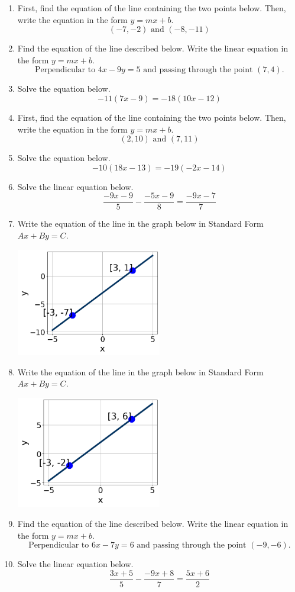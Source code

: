 \documentclass[14pt]{extbook}
\begin{document}
\begin{enumerate}
\item{
First, find the equation of the line containing the two points below. Then, write the equation in the form $ y=mx+b $.\[ (-7, -2) \text{ and } (-8, -11) \]} \newpage
\item{
Find the equation of the line described below. Write the linear equation in the form $y=mx+b$.\[ \text{Perpendicular to } 4 x - 9 y = 5 \text{ and passing through the point } (7, 4). \]} \newpage
\item{
Solve the equation below.\[ -11(7x -9) = -18(10x -12) \]} \newpage
\item{
First, find the equation of the line containing the two points below. Then, write the equation in the form $ y=mx+b $.\[ (2, 10) \text{ and } (7, 11) \]} \newpage
\item{
Solve the equation below.\[ -10(18x -13) = -19(-2x -14) \]} \newpage
\item{
Solve the linear equation below.\[ \frac{-9x -9}{5} - \frac{-5x -9}{8} = \frac{-9x -7}{7} \]} \newpage
\item{
Write the equation of the line in the graph below in Standard Form $Ax+By=C$.
\begin{center}
    \includegraphics[width=0.5\textwidth]{../Figures/linearGraphToStandardA.png}
\end{center}
} \newpage
\item{
Write the equation of the line in the graph below in Standard Form $Ax+By=C$.
\begin{center}
    \includegraphics[width=0.5\textwidth]{../Figures/linearGraphToStandardCopyA.png}
\end{center}
} \newpage
\item{
Find the equation of the line described below. Write the linear equation in the form $y=mx+b$.\[ \text{Perpendicular to } 6 x - 7 y = 6 \text{ and passing through the point } (-9, -6). \]} \newpage
\item{
Solve the linear equation below.\[ \frac{3x + 5}{5} - \frac{-9x + 8}{7} = \frac{5x + 6}{2} \]} \newpage
\end{enumerate}
\end{document}
